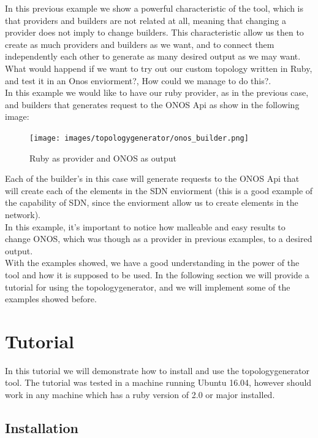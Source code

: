 In this previous example we show a powerful characteristic of the tool, which is that providers and builders are not related at all, meaning that changing a provider does not imply to change builders. This characteristic allow us then to create as much providers and builders as we want, and to connect them independently each other to generate as many desired output as we may want. \\

What would happend if we want to try out our custom topology written in Ruby, and test it in an Onos enviorment?, How could we manage to do this?.\\
In this example we would like to have our ruby provider, as in the previous case, and builders that generates request to the ONOS Api as show in the following image:

\begin{figure}[H]
\centering
\texttt{[image: images/topologygenerator/onos\_builder.png]}
\caption{Ruby as provider and ONOS as output}
\end{figure}

Each of the builder's in this case will generate requests to the ONOS Api that will create each of the elements in the SDN enviorment (this is a good example of the capability of SDN, since the enviorment allow us to create elements in the network). \\
In this example, it's important to notice how malleable and easy results to change ONOS, which was though as a provider in previous examples, to a desired output.\\

With the examples showed, we have a good understanding in the power of the tool and how it is supposed to be used. In the following section we will provide a tutorial for using the topologygenerator, and we will implement some of the examples showed before.

\section{Tutorial}

In this tutorial we will demonstrate how to install and use the topologygenerator tool. The tutorial was tested in a machine running Ubuntu 16.04, however should work in any machine which has a ruby version of 2.0 or major installed. \\

\subsection{Installation}

